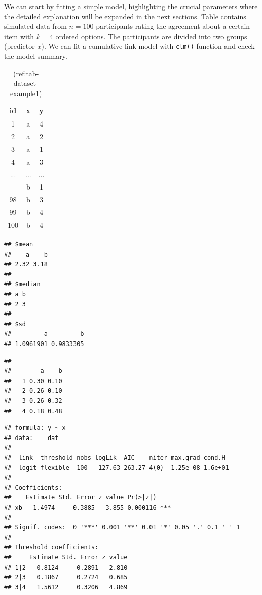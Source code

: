 \documentclass[
  man,floatsintext]{apa6}
\begin{document}
We can start by fitting a simple model, highlighting the crucial parameters where the detailed explanation will be expanded in the next sections. Table contains simulated data from \(n = 100\) participants rating the agreement about a certain item with \(k = 4\) ordered options. The participants are divided into two groups (predictor \(x\)). We can fit a cumulative link model with \texttt{clm()} function and check the model summary.

\scriptsize

\begin{table}

\caption{\label{tab:tab-dataset-example1}(ref:tab-dataset-example1)}
\centering
\begin{tabular}[t]{ccc}
\toprule
id & x & y\\
\midrule
1 & a & 4\\
2 & a & 2\\
3 & a & 1\\
4 & a & 3\\
... & ... & ...\\
\addlinespace
97 & b & 1\\
98 & b & 3\\
99 & b & 4\\
100 & b & 4\\
\bottomrule
\end{tabular}
\end{table}

\normalsize

\scriptsize

\begin{verbatim}
## $mean
##    a    b 
## 2.32 3.18 
## 
## $median
## a b 
## 2 3 
## 
## $sd
##         a         b 
## 1.0961901 0.9833305
\end{verbatim}

\begin{verbatim}
##    
##        a    b
##   1 0.30 0.10
##   2 0.26 0.10
##   3 0.26 0.32
##   4 0.18 0.48
\end{verbatim}

\normalsize

\scriptsize

\begin{verbatim}
## formula: y ~ x
## data:    dat
## 
##  link  threshold nobs logLik  AIC    niter max.grad cond.H 
##  logit flexible  100  -127.63 263.27 4(0)  1.25e-08 1.6e+01
## 
## Coefficients:
##    Estimate Std. Error z value Pr(>|z|)    
## xb   1.4974     0.3885   3.855 0.000116 ***
## ---
## Signif. codes:  0 '***' 0.001 '**' 0.01 '*' 0.05 '.' 0.1 ' ' 1
## 
## Threshold coefficients:
##     Estimate Std. Error z value
## 1|2  -0.8124     0.2891  -2.810
## 2|3   0.1867     0.2724   0.685
## 3|4   1.5612     0.3206   4.869
\end{verbatim}
\end{document}
